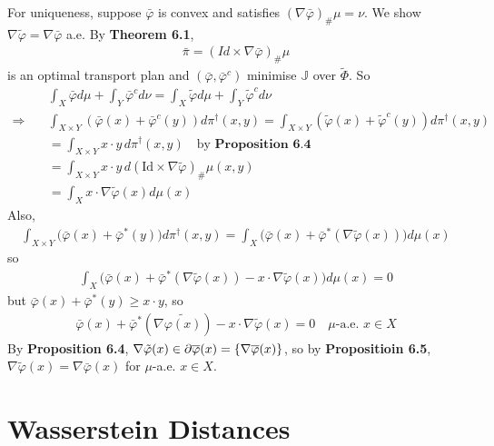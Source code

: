\documentclass[12pt,a4paper]{article}
\newenvironment{proof}
{\begin{changemargin}{1cm}{0.5cm} 
	}%
	{\end{changemargin}
}
\newenvironment{p}
{\begin{proof} 
	}%
	{\end{proof}
}
\begin{document}
\begin{p}
For uniqueness, suppose $\bar{\varphi}$ is convex and satisfies $(\nabla \bar{\varphi})_{\#}\mu =\nu$. We show $\nabla \tilde{\varphi} = \nabla \bar{\varphi}$ a.e. By \textbf{Theorem 6.1},
\begin{align*}
\bar{\pi} = (Id \times \nabla \bar{\varphi})_{\#} \mu
\end{align*}
is an optimal transport plan and $(\bar{\varphi}, \bar{\varphi}^c)$ minimise $\mathbb{J}$ over $\tilde{\Phi}$. So
\begin{align*}
& \int_X \bar{\varphi} d\mu + \int_{Y}\bar{\varphi}^c d\nu = \int_X \tilde{\varphi} d\mu + \int_Y \tilde{\varphi}^c d\nu \\
\Rightarrow \quad & \int_{X\times Y} (\bar{\varphi}(x) + \bar{\varphi}^c (y)) d\pi^{\dagger}(x,y) = \int_{X\times Y} (\tilde{\varphi}(x) + \tilde{\varphi}^c (y)) d\pi^{\dagger}(x,y) \\
&=\int_{X\times Y} x\cdot y \, d\pi^{\dagger} (x,y)  \quad \text{by } \textbf{Proposition 6.4}\\
&=\int_{X\times Y} x\cdot y \, d(\text{Id} \times \nabla \tilde{\varphi})_{\#} \mu(x,y)\\
&=\int_X x\cdot \nabla \tilde{\varphi}(x) d\mu (x)
\end{align*}
Also,
\begin{align*}
\int_{X\times Y} \big( \bar{\varphi}(x) +\bar{\varphi}^*(y) \big) d\pi^{\dagger}(x,y) = \int_X  \big( \bar{\varphi}(x) + \bar{\varphi}^*(\nabla \tilde{\varphi}(x)) \big) d\mu(x)
\end{align*}
so
\begin{align*}
\int_X \big( \bar{\varphi}(x) + \bar{\varphi}^*(\nabla \tilde{\varphi}(x)) - x\cdot \nabla \tilde{\varphi}(x)\big)d\mu(x)=0
\end{align*}
but $\bar{\varphi}(x) + \bar{\varphi}^*(y) \geq x\cdot y$, so
\begin{align*}
\bar{\varphi}(x) + \bar{\varphi}^*(\nabla \tilde{\varphi(x)}) - x\cdot \nabla \tilde{\varphi}(x) =0 \quad \mu\text{-a.e. } x\in X
\end{align*}
By \textbf{Proposition 6.4}, $\nabla \tilde{\varphi}(x) \in \partial \overline{\varphi}(x) = \{ \nabla \overline{\varphi}(x)\}$, so by \textbf{Propositioin 6.5}, $\nabla \tilde{\varphi}(x) = \nabla \bar{\varphi}(x)$ for $\mu$-a.e. $x\in X$.

\eop 
\end{p}

\section{Wasserstein Distances}
\end{document}
